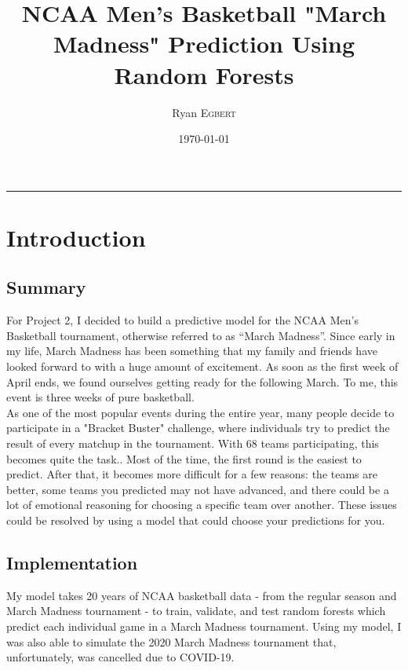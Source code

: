 \documentclass[10pt]{article}
\title{NCAA Men’s Basketball "March Madness" Prediction Using Random Forests}
\author{Ryan \textsc{Egbert}}
\date{\today}
\begin{document}
\maketitle
\doublespacing





\hrule

\section{Introduction}
    \subsection{Summary}
    For Project 2, I decided to build a predictive model for the NCAA Men’s Basketball tournament, otherwise referred to as “March Madness”.  Since early in my life, March Madness has been something that my family and friends have looked forward to with a huge amount of excitement.  As soon as the first week of April ends, we found ourselves getting ready for the following March.  To me, this event is three weeks of pure basketball.\\
	As one of the most popular events during the entire year, many people decide to participate in a "Bracket Buster" challenge, where individuals try to predict the result of every matchup in the tournament.  With 68 teams participating, this becomes quite the task..  Most of the time, the first round is the easiest to predict.  After that, it becomes more difficult for a few reasons: the teams are better, some teams you predicted may not have advanced, and there could be a lot of emotional reasoning for choosing a specific team over another.  These issues could be resolved by using a model that could choose your predictions for you.  
    \subsection{Implementation}
    My model takes 20 years of NCAA basketball data - from the regular season and March Madness tournament - to train, validate, and test random forests which predict each individual game in a March Madness tournament.  Using my model, I was also able to simulate the 2020 March Madness tournament that, unfortunately, was cancelled due to COVID-19.
\end{document}
